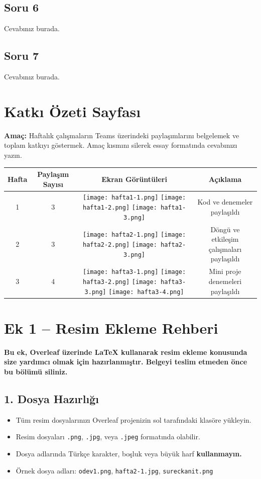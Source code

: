 \documentclass[a4paper,12pt]{article}
\begin{document}
\subsection{Soru 6}
Cevabınız burada.

\subsection{Soru 7}
Cevabınız burada.

\section{Katkı Özeti Sayfası}
\textbf{Amaç:} Haftalık çalışmaların Teams üzerindeki paylaşımlarını belgelemek ve toplam katkıyı göstermek. Amaç kısmını silerek essay formatında cevabınızı yazın.
\begin{landscape}
\begin{tabular}{|c|c|c|c|}
\hline
Hafta & Paylaşım Sayısı & Ekran Görüntüleri & Açıklama \\
\hline
1 & 3 & \texttt{[image: hafta1-1.png]} \texttt{[image: hafta1-2.png]} \texttt{[image: hafta1-3.png]} & Kod ve denemeler paylaşıldı \\
\hline
2 & 3 & \texttt{[image: hafta2-1.png]} \texttt{[image: hafta2-2.png]} \texttt{[image: hafta2-3.png]} & Döngü ve etkileşim çalışmaları paylaşıldı \\
\hline
3 & 4 & \texttt{[image: hafta3-1.png]} \texttt{[image: hafta3-2.png]} \texttt{[image: hafta3-3.png]} \texttt{[image: hafta3-4.png]} & Mini proje denemeleri paylaşıldı \\
\hline
\end{tabular}
\end{landscape}
\appendix
\section*{Ek 1 – Resim Ekleme Rehberi}

\textbf{Bu ek, Overleaf üzerinde LaTeX kullanarak resim ekleme konusunda size yardımcı olmak için hazırlanmıştır. 
Belgeyi teslim etmeden önce bu bölümü siliniz.}

\subsection*{1. Dosya Hazırlığı}
\begin{itemize}
    \item Tüm resim dosyalarınızı Overleaf projenizin sol tarafındaki klasöre yükleyin.
    \item Resim dosyaları \texttt{.png}, \texttt{.jpg}, veya \texttt{.jpeg} formatında olabilir.
    \item Dosya adlarında Türkçe karakter, boşluk veya büyük harf \textbf{kullanmayın.}
    \item Örnek dosya adları: \texttt{odev1.png}, \texttt{hafta2-1.jpg}, \texttt{sureckanit.png}
\end{itemize}
\end{document}
